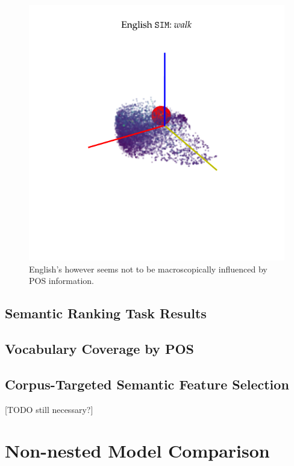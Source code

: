 \begin{figure}
    \centering
    \includegraphics[scale=1]{Figures/EngSIMPCAforwalk.pdf}
    \caption[English  Space Visualization]{English's  however seems not to be macroscopically influenced by POS information.}
    \label{fig:engSIMwalk}
\end{figure}

\subsection{Semantic Ranking Task Results}
\label{appsubsec:wnembeddingtests}


\subsection{Vocabulary Coverage by POS}



\subsection{Corpus-Targeted Semantic Feature Selection}
[TODO still necessary?]


\section{Non-nested Model Comparison}
\label{appsubsec:nonnestedcompres}

